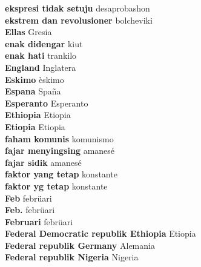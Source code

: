 \textbf{ ekspresi tidak setuju  } desaprobashon \\
\textbf{ ekstrem dan revolusioner  } bolcheviki \\
\textbf{ Ellas  } Gresia \\
\textbf{ enak didengar  } kiut \\
\textbf{ enak hati  } trankilo \\
\textbf{ England  } Inglatera \\
\textbf{ Eskimo  } èskimo \\
\textbf{ Espana  } Spaña \\
\textbf{ Esperanto  } Esperanto \\
\textbf{ Ethiopia  } Etiopia \\
\textbf{ Etiopia  } Etiopia \\
\textbf{ faham komunis  } komunismo \\
\textbf{ fajar menyingsing  } amanesé \\
\textbf{ fajar sidik  } amanesé \\
\textbf{ faktor yang tetap  } konstante \\
\textbf{ faktor yg tetap  } konstante \\
\textbf{ Feb  } febrüari \\
\textbf{ Feb.  } febrüari \\
\textbf{ Februari  } febrüari \\
\textbf{ Federal Democratic republik Ethiopia  } Etiopia \\
\textbf{ Federal republik Germany  } Alemania \\
\textbf{ Federal republik Nigeria  } Nigeria \\
